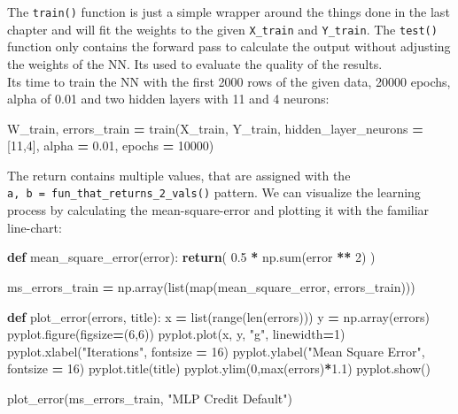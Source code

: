 \documentclass[
]{book}
\newenvironment{Shaded}{\begin{snugshade}}{\end{snugshade}}
\newcommand{\BuiltInTok}[1]{#1}
\newcommand{\ControlFlowTok}[1]{\textcolor[rgb]{0.13,0.29,0.53}{\textbf{#1}}}
\newcommand{\DecValTok}[1]{\textcolor[rgb]{0.00,0.00,0.81}{#1}}
\newcommand{\FloatTok}[1]{\textcolor[rgb]{0.00,0.00,0.81}{#1}}
\newcommand{\KeywordTok}[1]{\textcolor[rgb]{0.13,0.29,0.53}{\textbf{#1}}}
\newcommand{\NormalTok}[1]{#1}
\newcommand{\OperatorTok}[1]{\textcolor[rgb]{0.81,0.36,0.00}{\textbf{#1}}}
\newcommand{\StringTok}[1]{\textcolor[rgb]{0.31,0.60,0.02}{#1}}
\begin{document}
The \texttt{train()} function is just a simple wrapper around the things done in the last chapter and will fit the weights to the given \texttt{X\_train} and \texttt{Y\_train}. The \texttt{test()} function only contains the forward pass to calculate the output without adjusting the weights of the NN. Its used to evaluate the quality of the results.\\
Its time to train the NN with the first 2000 rows of the given data, 20000 epochs, alpha of 0.01 and two hidden layers with 11 and 4 neurons:

\begin{Shaded}
\begin{Highlighting}[]
\NormalTok{W\_train, errors\_train }\OperatorTok{=}\NormalTok{ train(X\_train, Y\_train, hidden\_layer\_neurons }\OperatorTok{=}\NormalTok{ [}\DecValTok{11}\NormalTok{,}\DecValTok{4}\NormalTok{], alpha }\OperatorTok{=} \FloatTok{0.01}\NormalTok{, epochs }\OperatorTok{=} \DecValTok{10000}\NormalTok{)}
\end{Highlighting}
\end{Shaded}

The return contains multiple values, that are assigned with the \texttt{a,\ b\ =\ fun\_that\_returns\_2\_vals()} pattern. We can visualize the learning process by calculating the mean-square-error and plotting it with the familiar line-chart:

\begin{Shaded}
\begin{Highlighting}[]
\KeywordTok{def}\NormalTok{ mean\_square\_error(error):}
  \ControlFlowTok{return}\NormalTok{( }\FloatTok{0.5} \OperatorTok{*}\NormalTok{ np.}\BuiltInTok{sum}\NormalTok{(error }\OperatorTok{**} \DecValTok{2}\NormalTok{) )}

\NormalTok{ms\_errors\_train }\OperatorTok{=}\NormalTok{ np.array(}\BuiltInTok{list}\NormalTok{(}\BuiltInTok{map}\NormalTok{(mean\_square\_error, errors\_train)))}

\KeywordTok{def}\NormalTok{ plot\_error(errors, title):}
\NormalTok{  x }\OperatorTok{=} \BuiltInTok{list}\NormalTok{(}\BuiltInTok{range}\NormalTok{(}\BuiltInTok{len}\NormalTok{(errors)))}
\NormalTok{  y }\OperatorTok{=}\NormalTok{ np.array(errors)}
\NormalTok{  pyplot.figure(figsize}\OperatorTok{=}\NormalTok{(}\DecValTok{6}\NormalTok{,}\DecValTok{6}\NormalTok{))}
\NormalTok{  pyplot.plot(x, y, }\StringTok{"g"}\NormalTok{, linewidth}\OperatorTok{=}\DecValTok{1}\NormalTok{)}
\NormalTok{  pyplot.xlabel(}\StringTok{"Iterations"}\NormalTok{, fontsize }\OperatorTok{=} \DecValTok{16}\NormalTok{)}
\NormalTok{  pyplot.ylabel(}\StringTok{"Mean Square Error"}\NormalTok{, fontsize }\OperatorTok{=} \DecValTok{16}\NormalTok{)}
\NormalTok{  pyplot.title(title)}
\NormalTok{  pyplot.ylim(}\DecValTok{0}\NormalTok{,}\BuiltInTok{max}\NormalTok{(errors)}\OperatorTok{*}\FloatTok{1.1}\NormalTok{)}
\NormalTok{  pyplot.show()}
  
\NormalTok{plot\_error(ms\_errors\_train, }\StringTok{"MLP Credit Default"}\NormalTok{)}
\end{Highlighting}
\end{Shaded}
\end{document}
